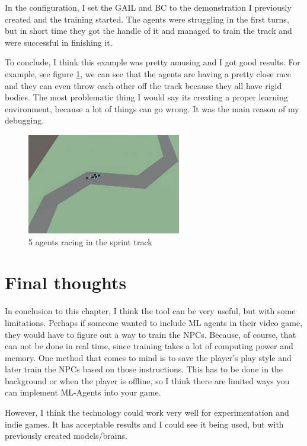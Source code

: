 \documentclass[a4paper,12pt,openright]{book}
\begin{document}
In the configuration, I set the GAIL and BC to the demonstration I previously created and the training started. The agents were struggling in the first turns, but in short time they got the handle of it and managed to train the track and were successful in finishing it.

To conclude, I think this example was pretty amusing and I got good results. For example, see figure \ref{Sprintracing}, we can see that  the agents are having a pretty close race and they can even throw each other off the track because they all have rigid bodies. The most problematic thing I would say its creating a proper learning environment, because a lot of things can go wrong. It was the main reason of my debugging.

\begin{figure}[h]
\begin{center}
\includegraphics[width=0.6\textwidth]{Images/SprintRacing.png}
\end{center}
\caption{5 agents racing in the sprint track}
\label{Sprintracing}
\end{figure}

\section{Final thoughts}

In conclusion to this chapter, I think the tool can be very useful, but with some limitations. Perhaps if someone wanted to include ML agents in their video game, they would have to figure out a way to train the NPCs. Because, of course, that can not be done in real time, since training takes a lot of computing power and memory. One method that comes to mind is to save the player's play style and later train the NPCs based on those instructions. This has to be done in the background or when the player is offline, so I think there are limited ways you can implement ML-Agents \cite{MLAgents} into your game.

However, I think the technology could work very well for experimentation and indie games. It has acceptable results and I could see it being used, but with previously created models/brains.
\end{document}
